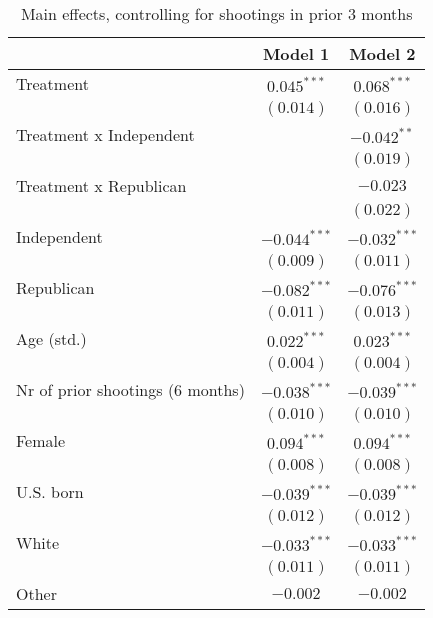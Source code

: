 
\begin{table}
\caption{Main effects, controlling for shootings in prior 3 months}
\begin{center}
\begin{tabular}{l c c}
\toprule
 & Model 1 & Model 2 \\
\midrule
Treatment                        & $0.045^{***}$  & $0.068^{***}$  \\
                                 & $(0.014)$      & $(0.016)$      \\
Treatment x Independent          &                & $-0.042^{**}$  \\
                                 &                & $(0.019)$      \\
Treatment x Republican           &                & $-0.023$       \\
                                 &                & $(0.022)$      \\
Independent                      & $-0.044^{***}$ & $-0.032^{***}$ \\
                                 & $(0.009)$      & $(0.011)$      \\
Republican                       & $-0.082^{***}$ & $-0.076^{***}$ \\
                                 & $(0.011)$      & $(0.013)$      \\
Age (std.)                       & $0.022^{***}$  & $0.023^{***}$  \\
                                 & $(0.004)$      & $(0.004)$      \\
Nr of prior shootings (6 months) & $-0.038^{***}$ & $-0.039^{***}$ \\
                                 & $(0.010)$      & $(0.010)$      \\
Female                           & $0.094^{***}$  & $0.094^{***}$  \\
                                 & $(0.008)$      & $(0.008)$      \\
U.S. born                        & $-0.039^{***}$ & $-0.039^{***}$ \\
                                 & $(0.012)$      & $(0.012)$      \\
White                            & $-0.033^{***}$ & $-0.033^{***}$ \\
                                 & $(0.011)$      & $(0.011)$      \\
Other                            & $-0.002$       & $-0.002$       \\

\end{tabular}
\end{center}
\end{table}
